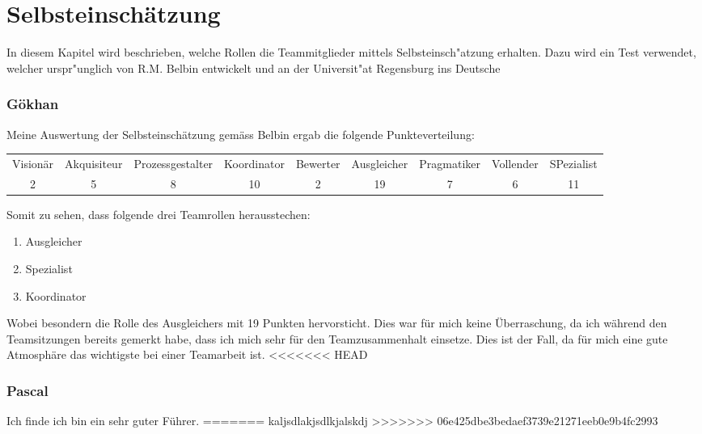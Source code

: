 
\chapter{Selbsteinschätzung}

In diesem Kapitel wird beschrieben, welche Rollen die Teammitglieder mittels Selbsteinsch"atzung erhalten. Dazu wird ein Test verwendet, welcher urspr"unglich von R.M. Belbin \cite{belbin1981management} entwickelt und an der Universit"at Regensburg ins Deutsche %

\subsection*{Gökhan}

Meine Auswertung der Selbsteinschätzung gemäss Belbin ergab die folgende Punkteverteilung:

\begin{tabular}{ccccccccc}
  Visionär & Akquisiteur & Prozessgestalter & Koordinator & Bewerter & Ausgleicher & Pragmatiker & Vollender & SPezialist \\
  2 & 5 & 8 & 10 & 2 & 19 & 7 & 6 & 11 \\
\end{tabular}

Somit zu sehen, dass folgende drei Teamrollen herausstechen: \\
\begin{enumerate} 
\item Ausgleicher 
\item Spezialist
\item Koordinator
\end{enumerate}

Wobei besondern die Rolle des Ausgleichers mit 19 Punkten hervorsticht. Dies war für mich keine Überraschung, da ich während den Teamsitzungen bereits gemerkt habe, dass ich mich sehr für den Teamzusammenhalt einsetze. Dies ist der Fall, da für mich eine gute Atmosphäre das wichtigste bei einer Teamarbeit ist.
<<<<<<< HEAD

\subsection*{Pascal}

Ich finde ich bin ein sehr guter Führer.
=======
kaljsdlakjsdlkjalskdj
>>>>>>> 06e425dbe3bedaef3739e21271eeb0e9b4fc2993

